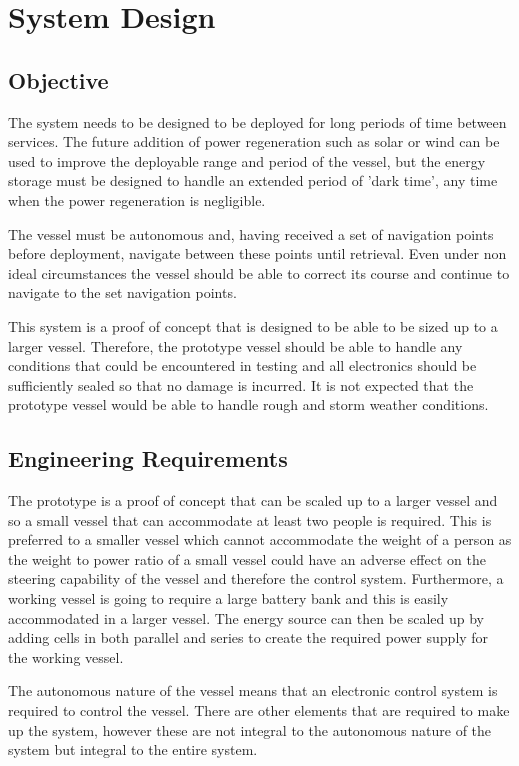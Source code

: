 \section{System Design}
	\subsection{Objective}
	The system needs to be designed to be deployed for long periods of time between services. The future addition of power regeneration such as solar or wind can be used to improve the deployable range and period of the vessel, but the energy storage must be designed to handle an extended period of 'dark time', any time when the power regeneration is negligible. \par
	The vessel must be autonomous and, having received a set of navigation points before deployment, navigate between these points until retrieval. Even under non ideal circumstances the vessel should be able to correct its course and continue to navigate to the set navigation points. \par
	This system is a proof of concept that is designed to be able to be sized up to a larger vessel. Therefore, the prototype vessel should be able to handle any conditions that could be encountered in testing and all electronics should be sufficiently sealed so that no damage is incurred. It is not expected that the prototype vessel would be able to handle rough and storm weather conditions.\par
	\subsection{Engineering Requirements}
	The prototype is a proof of concept that can be scaled up to a larger vessel and so a small vessel that can accommodate at least two people is required. This is preferred to a smaller vessel which cannot accommodate the weight of a person as the weight to power ratio of a small vessel could have an adverse effect on the steering capability of the vessel and therefore the control system.
	Furthermore, a working vessel is going to require a large battery bank and this is easily accommodated in a larger vessel. The energy source can then be scaled up by adding cells in both parallel and series to create the required power supply for the working vessel.\par
	The autonomous nature of the vessel means that an electronic control system is required to control the vessel. There are other elements that are required to make up the system, however these are not integral to the autonomous nature of the system but integral to the entire system. \par
